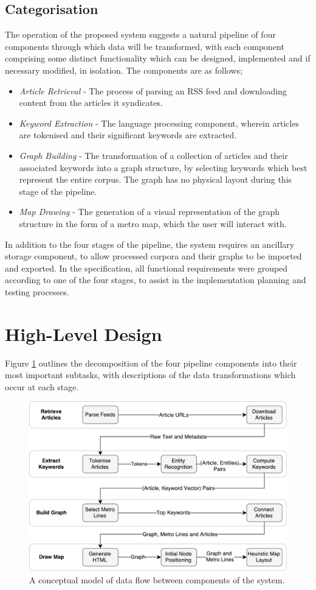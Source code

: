 \subsection{Categorisation}
The operation of the proposed system suggests a natural pipeline of four components through which data will be transformed, with each component comprising some distinct functionality which can be designed, implemented and if necessary modified, in isolation. The components are as follows;
\begin{itemize}
	\item \textit{Article Retrieval} - The process of parsing an RSS feed and downloading content from the articles it syndicates.
	\item \textit{Keyword Extraction} - The language processing component, wherein articles are tokenised and their significant keywords are extracted.
	\item \textit{Graph Building} - The transformation of a collection of articles and their associated keywords into a graph structure, by selecting keywords which best represent the entire corpus. The graph has no physical layout during this stage of the pipeline.
	\item \textit{Map Drawing} - The generation of a visual representation of the graph structure in the form of a metro map, which the user will interact with.
\end{itemize}
In addition to the four stages of the pipeline, the system requires an ancillary storage component, to allow processed corpora and their graphs to be imported and exported. In the specification, all functional requirements were grouped according to one of the four stages, to assist in the implementation planning and testing processes.

\section{High-Level Design}
Figure \ref{fig:dfp} outlines the decomposition of the four pipeline components into their most important subtasks, with descriptions of the data transformations which occur at each stage.

\begin{figure}[htbp!]
	\centering
	\includegraphics[width=\textwidth]{img/design/DataFlow.pdf}
	\caption{A conceptual model of data flow between components of the system.}
	\label{fig:dfp}
\end{figure}

